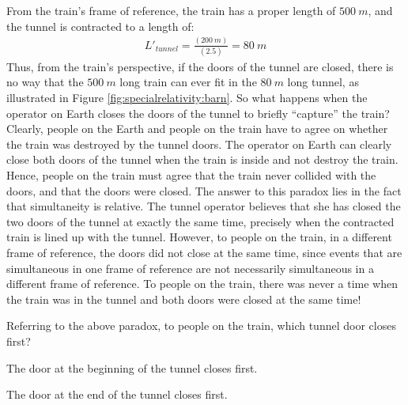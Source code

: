From the train's frame of reference, the train has a proper length of $\SI{500}{m}$, and the tunnel is contracted to a length of:
\begin{align*}
L'_{tunnel}=\frac{(\SI{200}{m})}{(2.5)}=\SI{80}{m}
\end{align*}
Thus, from the train's perspective, if the doors of the tunnel are closed, there is no way that the $\SI{500}{m}$ long train can ever fit in the $\SI{80}{m}$ long tunnel, as illustrated in Figure \ref{fig:specialrelativity:barn}. So what happens when the operator on Earth closes the doors of the tunnel to briefly ``capture'' the train? 
Clearly, people on the Earth and people on the train have to agree on whether the train was destroyed by the tunnel doors. The operator on Earth can clearly close both doors of the tunnel when the train is inside and not destroy the train. Hence, people on the train must agree that the train never collided with the doors, and that the doors were closed. The answer to this paradox lies in the fact that simultaneity is relative. The tunnel operator believes that she has closed the two doors of the tunnel at exactly the same time, precisely when the contracted train is lined up with the tunnel. However, to people on the train, in a different frame of reference, the doors did not close at the same time, since events that are simultaneous in one frame of reference are not necessarily simultaneous in a different frame of reference. To people on the train, there was never a time when the train was in the tunnel and both doors were closed at the same time!
\begin{checkpoint}{}
	\begin{MCquestion}{Referring to the above paradox, to people on the train, which tunnel door closes first?}
		\item The door at the beginning of the tunnel closes first. 
		\item The door at the end of the tunnel closes first. \correct
	\end{MCquestion}
\end{checkpoint}

